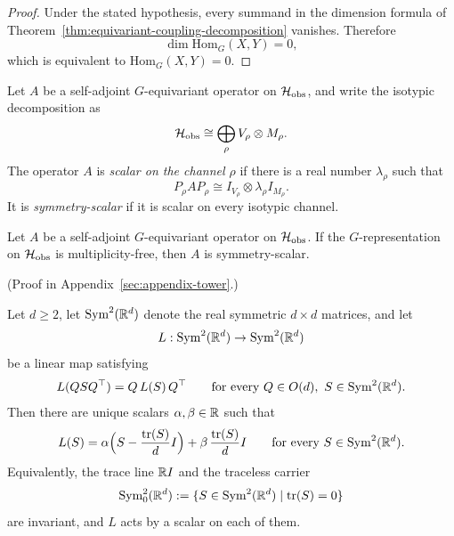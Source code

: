\begin{proof}
Under the stated hypothesis, every summand in the dimension formula of
Theorem~\ref{thm:equivariant-coupling-decomposition} vanishes. Therefore
\[
\dim \mathrm{Hom}_G(X,Y)=0,
\]
which is equivalent to $\mathrm{Hom}_G(X,Y)=0$.
\end{proof}

\begin{definition}
\label{def:symmetry-scalar-closure}
Let $A$ be a self-adjoint $G$-equivariant operator on $\mathcal{H}_{\mathrm{obs}}$, and
write the isotypic decomposition as
\[
\mathcal{H}_{\mathrm{obs}} \cong \bigoplus_{\rho} V_{\rho}\otimes M_{\rho}.
\]
The operator $A$ is \emph{scalar on the channel $\rho$} if there is a real
number $\lambda_{\rho}$ such that
\[
P_{\rho}AP_{\rho}\cong I_{V_{\rho}}\otimes \lambda_{\rho}I_{M_{\rho}}.
\]
It is \emph{symmetry-scalar} if it is scalar on every isotypic channel.
\end{definition}

\begin{theorem}
\label{thm:multiplicity-free-closures-scalar}
Let $A$ be a self-adjoint $G$-equivariant operator on $\mathcal{H}_{\mathrm{obs}}$. If
the $G$-representation on $\mathcal{H}_{\mathrm{obs}}$ is multiplicity-free, then $A$
is symmetry-scalar.
\end{theorem}

(Proof in Appendix~\ref{sec:appendix-tower}.)

\begin{theorem}
\label{thm:orthogonal-symmetric-tensor-scalarization}
Let $d\ge 2$, let $\mathrm{Sym}^2(\mathbb{R}^d)$ denote the real symmetric
$d\times d$ matrices, and let
\[
L:\mathrm{Sym}^2(\mathbb{R}^d)\to \mathrm{Sym}^2(\mathbb{R}^d)
\]
be a linear map satisfying
\[
L(QSQ^\top)=Q\,L(S)\,Q^\top
\qquad\text{for every }Q\in O(d),\ S\in \mathrm{Sym}^2(\mathbb{R}^d).
\]
Then there are unique scalars $\alpha,\beta\in\mathbb{R}$ such that
\[
L(S)
=
\alpha\Bigl(S-\frac{\operatorname{tr}(S)}{d}I\Bigr)
+
\beta\,\frac{\operatorname{tr}(S)}{d}I
\qquad\text{for every }S\in \mathrm{Sym}^2(\mathbb{R}^d).
\]
Equivalently, the trace line $\mathbb{R} I$ and the traceless carrier
\[
\mathrm{Sym}^2_0(\mathbb{R}^d)
:=
\{S\in \mathrm{Sym}^2(\mathbb{R}^d)\mid \operatorname{tr}(S)=0\}
\]
are invariant, and $L$ acts by a scalar on each of them.
\end{theorem}

